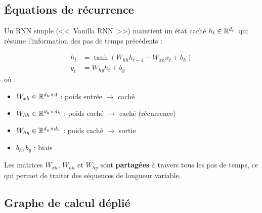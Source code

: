 \subsection{\'Equations de r\'ecurrence}

Un RNN simple (<<~Vanilla RNN~>>) maintient un \'etat cach\'e
$h_t \in \mathbb{R}^{d_h}$ qui r\'esume l'information des pas de temps pr\'ec\'edents :

\begin{formules}[title=\textbf{RNN -- \'Equations fondamentales}]
\begin{align}
h_t &= \tanh(W_{hh} h_{t-1} + W_{xh} x_t + b_h)
\label{eq:rnn-hidden} \\
y_t &= W_{hy} h_t + b_y
\label{eq:rnn-output}
\end{align}
o\`u :
\begin{itemize}
  \item $W_{xh} \in \mathbb{R}^{d_h \times d}$ : poids entr\'ee $\to$ cach\'e
  \item $W_{hh} \in \mathbb{R}^{d_h \times d_h}$ : poids cach\'e $\to$ cach\'e (r\'ecurrence)
  \item $W_{hy} \in \mathbb{R}^{d_y \times d_h}$ : poids cach\'e $\to$ sortie
  \item $b_h, b_y$ : biais
\end{itemize}
\end{formules}

\begin{remarque}
Les matrices $W_{xh}$, $W_{hh}$ et $W_{hy}$ sont \textbf{partag\'ees} \`a
travers tous les pas de temps, ce qui permet de traiter des s\'equences de
longueur variable.
\end{remarque}

\subsection{Graphe de calcul d\'epli\'e}

